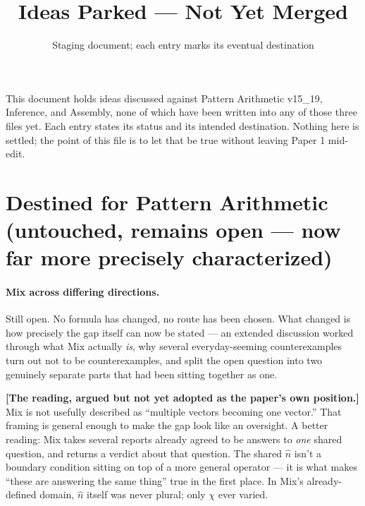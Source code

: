 \documentclass[11pt]{article}
\title{Ideas Parked --- Not Yet Merged}
\author{Staging document; each entry marks its eventual destination}
\date{}
\begin{document}
\maketitle

\noindent This document holds ideas discussed against Pattern Arithmetic
v15\_19, Inference, and Assembly, none of which have been written into
any of those three files yet. Each entry states its status and its
intended destination. Nothing here is settled; the point of this file
is to let that be true without leaving Paper 1 mid-edit.

\section{Destined for Pattern Arithmetic (untouched, remains open ---
now far more precisely characterized)}

\paragraph{Mix across differing directions.} Still open. No formula
has changed, no route has been chosen. What changed is how precisely
the gap itself can now be stated --- an extended discussion worked
through what Mix actually \emph{is}, why several everyday-seeming
counterexamples turn out not to be counterexamples, and split the
open question into two genuinely separate parts that had been sitting
together as one.

\textbf{[The reading, argued but not yet adopted as the paper's own
position.]} Mix is not usefully described as ``multiple vectors
becoming one vector.'' That framing is general enough to make the
gap look like an oversight. A better reading: Mix takes several
reports already agreed to be answers to \emph{one} shared question,
and returns a verdict about that question. The shared $\hat n$ isn't
a boundary condition sitting on top of a more general operator --- it
is what makes ``these are answering the same thing'' true in the
first place. In Mix's already-defined domain, $\hat n$ itself was
never plural; only $\chi$ ever varied.
\end{document}
